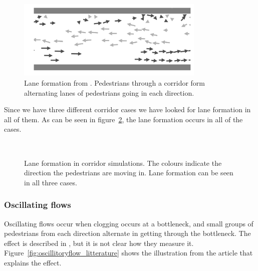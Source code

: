 \begin{figure}[h]
    \centering
    \includegraphics[width=0.8\textwidth]{Figures/flow_lanes_litterature.png}
    \caption[Lane formation from \cite{lanes}]{Lane formation from 
    \cite{lanes}. Pedestrians through a corridor form alternating lanes of 
    pedestrians going in each direction.}
    \label{fig:lanes-literature}
\end{figure}

Since we have three different corridor cases we have looked for lane
formation in all of them. As can be seen in figure~\ref{fig:laneformation}, 
the lane formation occurs in all of the cases.

\begin{figure}[h]
    \centering
    \\
    \caption[Lane formation in corridor simulations]{Lane formation in 
    corridor simulations. The colours indicate the direction the pedestrians 
    are moving in. Lane formation can be seen in all three cases.}
    \label{fig:laneformation}
\end{figure}

\subsubsection{Oscillating flows}
Oscillating flows occur when clogging occurs at a bottleneck, and small groups 
of pedestrians from each direction alternate in getting through the 
bottleneck. The effect is described in \cite{oscil}, but it is not clear how 
they measure it. Figure~\ref{fig:oscillitoryflow_litterature} shows the 
illustration from the article that explains the effect.

